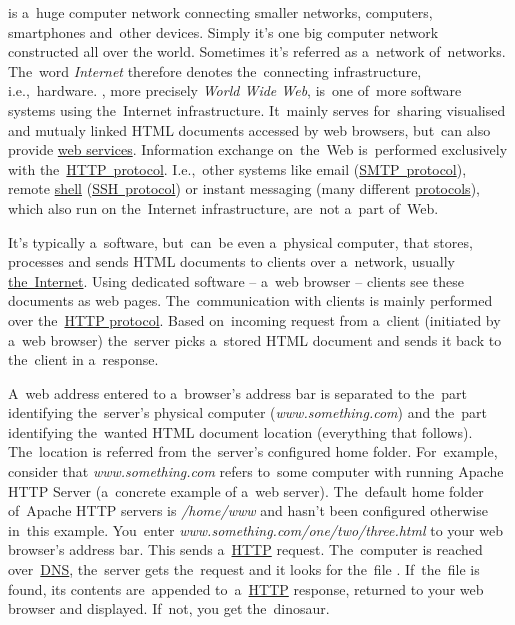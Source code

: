 \label{internetweb}
\begin{itemize}
     is a~huge computer network connecting smaller networks, computers, smartphones and~other devices.
            Simply it's one big computer network constructed all over the world.
            Sometimes it's referred as a~network of~networks.
            The~word \textit{Internet} therefore denotes the~connecting infrastructure, i.e.,~hardware.
    , more precisely \textit{World Wide Web}, is~one of~more software systems using the~Internet infrastructure.
            It~mainly serves for~sharing visualised and mutualy linked HTML documents accessed by web browsers, but~can also provide \hyperref[webserviceapplication]{web services}.
            Information exchange on~the~Web is~performed exclusively with the~\hyperref[http]{HTTP~protocol}.
            I.e.,~other systems like email (\hyperref[smtp]{SMTP~protocol}), remote \hyperref[shellcligui]{shell} (\hyperref[ssh]{SSH~protocol}) or instant messaging (many different \hyperref[protocolstandard]{protocols}), which also run on the~Internet infrastructure, are~not a~part of~Web.
\end{itemize}

\label{namespaces}

\label{webserver}
It's typically a~software, but~can~be even a~physical computer, that stores, processes and sends HTML documents to clients over a~network, usually \hyperref[internetweb]{the~Internet}.
Using dedicated software -- a~web browser -- clients see these documents as web pages.
The~communication with clients is mainly performed over the~\hyperref[http]{HTTP protocol}.
Based on~incoming request from a~client (initiated by a~web browser) the~server picks a~stored HTML document and sends it back to the~client in a~response.

A~web address entered to a~browser's address bar is separated to the~part identifying the~server's physical computer (\textit{www.something.com}) and the~part identifying the~wanted HTML document location (everything that follows).
The~location is referred from the~server's configured home folder.
For~example, consider that \textit{www.something.com} refers to~some computer with running Apache HTTP Server (a~concrete example of a~web server).
The~default home folder of~Apache HTTP servers is \textit{/home/www} and hasn't been configured otherwise in~this example.
You~enter \textit{www.something.com/one/two/three.html} to your web browser's address bar.
This sends a~\hyperref[http]{HTTP} request.
The~computer is reached over~\hyperref[dns]{DNS}, the~server gets the~request and it looks for the~file .
If~the~file is found, its contents are~appended to~a~\hyperref[http]{HTTP} response, returned to your web browser and displayed.
If~not, you get the~dinosaur.

